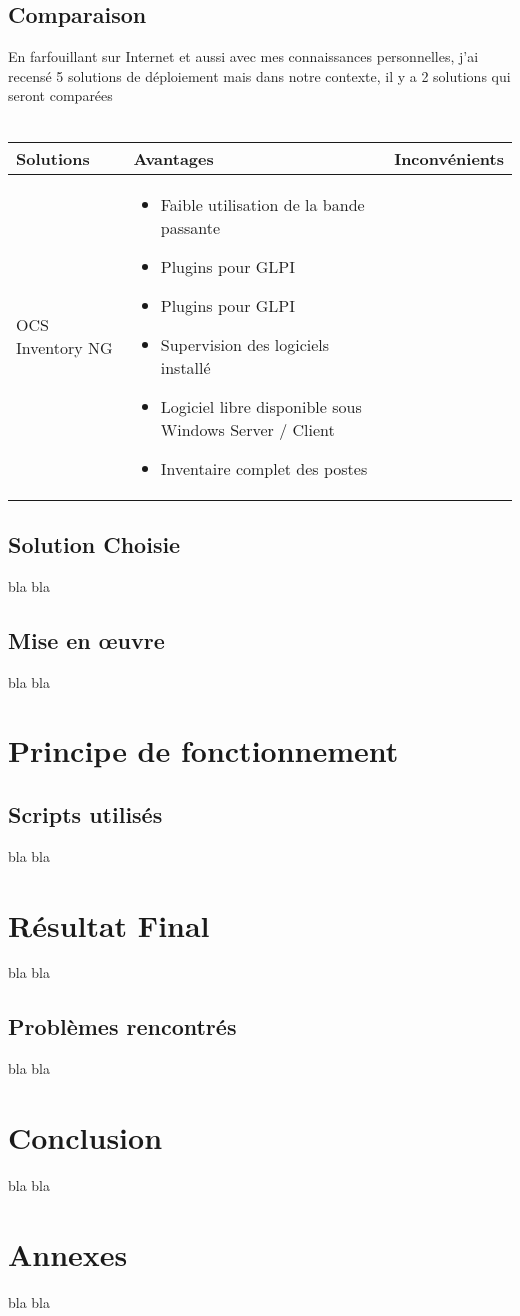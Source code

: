 \documentclass[11pt,a4paper,oneside]{article}
\begin{document}
\subsection{Comparaison}
En farfouillant sur Internet et aussi avec mes connaissances personnelles, j'ai recensé 5 solutions de déploiement mais dans notre contexte, il y a 2 solutions qui seront comparées \\ \\
\begin{tabular}{|p{3.1cm}|p{7cm}|p{7cm}|}
	\hline
	Solutions & Avantages & Inconvénients \\
	\hline
	\centering OCS Inventory NG  & \begin{itemize}
							\item Faible utilisation de la bande passante 
							\item Plugins pour GLPI
							\item Plugins pour GLPI
							\item Supervision des logiciels installé
							\item Logiciel libre disponible sous Windows Server / Client
							\item Inventaire complet des postes							
						\end{itemize} & \\
	\hline	
\end{tabular}
\subsection{Solution Choisie}
bla bla
\\
\subsection{Mise en \oe{}uvre}
bla bla
\\
\section{Principe de fonctionnement}
\subsection{Scripts utilisés}
bla bla
\section{Résultat Final}
bla bla
\subsection{Problèmes rencontrés}
bla bla
\section{Conclusion}
bla bla
\section{Annexes}
bla bla
\end{document}
